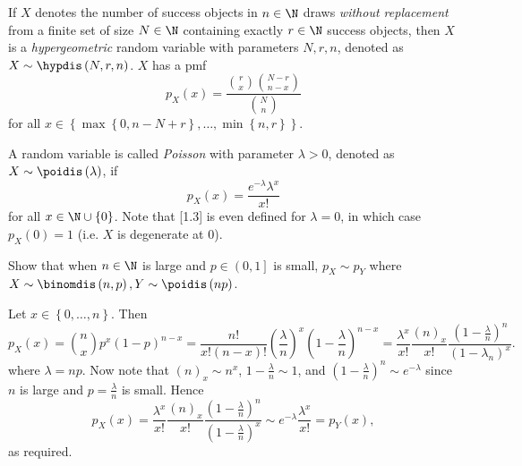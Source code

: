 \documentclass[stat333]{subfiles}
\begin{document}
    \np[Hypergeometric]If $X$ denotes the number of success objects in $n\in\N$ draws \textit{without replacement} from a finite set of size $N\in\N$ containing exactly $r\in\N$ success objects, then $X$ is a \emph{hypergeometric} random variable with parameters $N,r,n$, denoted as $X\sim\hypdis\left( N,r,n \right)$. $X$ has a pmf
    \begin{equation*}
        p_X\left( x \right) = \frac{\binom{r}{x}\binom{N-r}{n-x}}{\binom{N}{n}}
    \end{equation*}
    for all $x\in\left\lbrace \max\left\lbrace 0,n-N+r \right\rbrace , \ldots, \min\left\lbrace n,r \right\rbrace  \right\rbrace $.

    \np[Poisson]A random variable is called \emph{Poisson} with parameter $\lambda>0$, denoted as $X\sim\poidis\left( \lambda \right)$, if
    \begin{equation}
        p_X\left( x \right) = \frac{e^{-\lambda}\lambda^x}{x!}
    \end{equation}
    for all $x\in\N\cup\left\lbrace 0 \right\rbrace $. Note that [1.3] is even defined for $\lambda=0$, in which case $p_X\left( 0 \right) = 1$ (i.e. $X$ is degenerate at $0$).

    Show that when $n\in\N$ is large and $p\in\left( 0,1 \right]$ is small, $p_X\sim p_Y$ where $X\sim\binomdis\left( n,p \right) , Y\sim\poidis\left( np \right)$.

    \begin{subproof}
        Let $x\in\left\lbrace 0,\ldots,n \right\rbrace$. Then
        \begin{equation*}
            p_X\left( x \right) = \binom{n}{x}p^x\left( 1-p \right) ^{n-x} = \frac{n!}{x!\left( n-x \right) !}\left( \frac{\lambda}{n} \right) ^x\left( 1-\frac{\lambda}{n} \right) ^{n-x} = \frac{\lambda^x}{x!} \frac{\left( n \right) _x}{x!} \frac{\left( 1-\frac{\lambda}{n} \right) ^n}{\left( 1-\lambda_n \right) ^x}.
        \end{equation*}
        where $\lambda = np$. Now note that $\left( n \right) _x\sim n^x$, $1-\frac{\lambda}{n}\sim 1$, and $\left( 1-\frac{\lambda}{n} \right) ^n \sim e^{-\lambda}$ since $n$ is large and $p = \frac{\lambda}{n}$ is small. Hence
        \begin{equation*}
            p_X\left( x \right) = \frac{\lambda^x}{x!} \frac{\left( n \right) _x}{x!} \frac{\left( 1-\frac{\lambda}{n} \right) ^n}{\left( 1-\frac{\lambda}{n} \right) ^x} \sim e^{-\lambda} \frac{\lambda^x}{x!} = p_Y\left( x \right) ,
        \end{equation*}
        as required.
    \end{subproof}
\end{document}
